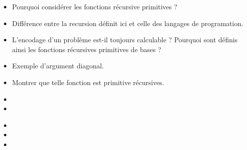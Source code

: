 \documentclass{agregfiche}
\begin{document}
\secquestionsclassiques

\begin{itemize}
	\item Pourquoi considérer les fonctions récursive primitives ?
	\item Différence entre la recursion définit ici et celle des langages de programation.
	\item L'encodage d'un problème est-il toujours calculable ? Pourquoi sont définis ainsi les fonctions récursives primitives de bases ?
	\item Exemple d'argument diagonal.
	\item Montrer que telle fonction est primitive récursives.
	
\end{itemize}
\secreferences

\begin{itemize}
\item {}
\item 
\end{itemize}

\secdev

\begin{itemize}
	\item {}
	\item {}
    \item 
\end{itemize}
\end{document}
